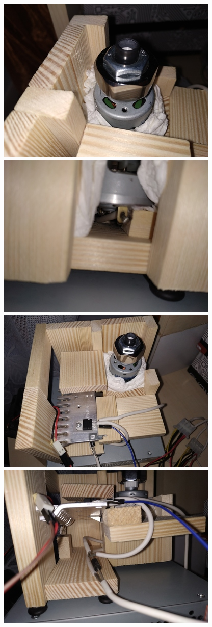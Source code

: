 \documentclass[a4paper,oneside,11pt]{report}
\begin{document}
\begin{enumerate}[1.]
\includegraphics[scale=0.5]{images/20.jpg} 
\includegraphics[scale=0.5]{images/21.jpg} 
\includegraphics[scale=0.5]{images/22.jpg} 
\includegraphics[scale=0.5]{images/23.jpg}

\end{enumerate}
\end{document}
